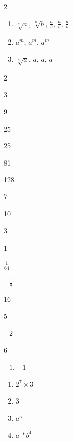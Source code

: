 \documentclass{oblivoir}
\begin{document}
\begin{multicols*}{2}
%
\begin{enumerate}
\item[(b)]
\(\sqrt[n]a\), \(\sqrt[n]b\), \(\frac ab\), \(\frac ab\), \(\frac ab\)
\item[(c)]
\(a^m\), \(a^m\), \(a^m\)
\item[(d)]
\(\sqrt[n]a\), \(a\), \(a\), \(a\)
\end{enumerate}

%
\begin{enumerate*}[itemjoin=\qquad]
\item
2
\item
3
\item
9
\item
25
\end{enumerate*}

%
\begin{enumerate*}[itemjoin=\qquad\quad]
\item
25
\item
81
\item
128
\end{enumerate*}

%
\begin{enumerate*}[itemjoin=\qquad]
\item
7
\item
10
\item
3
\end{enumerate*}

%
\begin{enumerate*}[itemjoin=\quad]
\item
1
\item
\(\frac1{64}\)
\item
\(-\frac18\)
\item
16
\end{enumerate*}

%
\begin{enumerate*}[itemjoin=\quad]
\item
5
\item
\(-2\)
\item
\(6\)
\item
\(-1\), \(-1\)
\end{enumerate*}

%
\begin{enumerate}
\item
\(2^7\times3\)
\item
\(3\)
\item
\(a^5\)
\item
\(a^{-6}b^4\)
\end{enumerate}


\end{multicols*}
\end{document}
